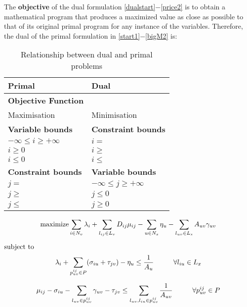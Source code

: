 \documentclass[journal]{IEEEtran}
\def\Max{{\rm maximize }}
\def\ST{{\rm subject\ to}}
\begin{document}
The \textbf{objective} of the dual formulation \eqref{dualstart}$-$\eqref{price2} is to obtain a mathematical program that produces a maximized value as close as possible to that of its original primal program for any instance of the variables. Therefore, the dual of the primal formulation in \eqref{start1}$-$\eqref{bigM2} is:
\begin{table}[t]
\renewcommand{\arraystretch}{1.5}
\caption{Relationship between dual and primal problems}
\label{primaldual}
\centering
{}
\begin{tabular}{l||l}
\hline
\bfseries Primal & \bfseries Dual\\
\hline\hline
\textbf{Objective Function} & \\
Maximisation & Minimisation\\ \hline
\textbf{Variable bounds} & \textbf{Constraint bounds}\\
$-\infty \leq i \geq +\infty $ &  $i =$\\
$i \geq 0$ &  $i \geq $\\
$i \leq 0$ &  $i \leq$\\ \hline
\textbf{Constraint bounds} & \textbf{Variable bounds}\\
$j  = $ &  $ -\infty \leq j \geq +\infty $\\
$j \geq $ &  $j \leq 0  $\\
$ j \leq  $ &  $j \geq 0 $\\
\hline
\end{tabular}
\end{table}

\begin{equation}
\Max \sum \limits_{i \in N_v}\lambda_i  + \sum \limits_{l_{ij} \in L_v}D_{ij}\mu_{ij} - \sum \limits_{u \in N_s}\eta_u - \sum \limits_{l_{uv} \in L_s}A_{uv}\gamma_{uv}
\label{dualstart}
\end{equation}

$\ST$
\begin{equation}
\lambda_i + \sum \limits_{p_{uv}^{ij} \in P} (\sigma_{iu} + \tau_{jv}) - \eta_u \leq \frac{1}{A_{u}}\hspace{10 mm}\forall l_{iu} \in L_x
\label{price1}
\end{equation}

\begin{equation}
\mu_{ij} - \sigma_{iu} - \sum \limits_{l_{uv} \in p_{uv}^{ij}}\gamma_{uv} -  \tau_{jv} \leq \sum \limits_{ l_{uv}, l_{iu}\in p_{uv}^{ij}} \frac{1}{A_{uv}}\hspace{10 mm}\forall {p_{uv}^{ij} \in P}
\label{price2}
\end{equation}
\end{document}
